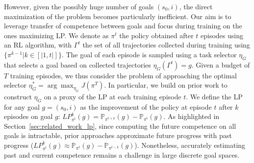 However, given the possibly huge number of goals $(s_0,i)$, the direct maximization of the problem becomes particularly inefficient. %
Our aim is to leverage transfer of competence between goals and focus during training on the ones maximizing LP. We denote as $\pi^t$   %
the policy obtained after $t$ episodes using an RL algorithm, with $\Gamma^{t}$ the set of all trajectories collected during training using $\{ \pi^{k-1}| k \in [|1, t|] \}$. The goal of each episode is sampled using a task selector $\eta_{G}$ that selects a goal based on collected trajectories $\eta_{G}(\Gamma^t)=g$. %
Given a budget of $T$ training episodes, we thus consider the problem of approaching the optimal selector $\eta^*_{G} = \arg\max_{\eta_{G}} J(\pi^T)$. In particular, we build on prior work to construct $\eta_{G}$ on a proxy of the LP at each training episode $t$. We define the LP for any goal $g=(s_0,i)$ as the improvement of the policy at episode $t$ after $k$ episodes on goal $g$:  $LP^k_{\pi^t}(g)=\mathbb{P}_{\pi^{t+k}}(g) - \mathbb{P}_{\pi^{t}}(g)$. As highlighted in Section~\ref{sec:related_work_lp}, since computing the future competence on all goals is intractable, prior approaches approximate future progress with past progress ($LP^k_{\pi^t}(g) \approx \mathbb{P}_{\pi^{t}}(g) - \mathbb{P}_{\pi^{t-k}}(g)$). Nonetheless, accurately estimating past and current competence remains a challenge in large discrete goal spaces.
